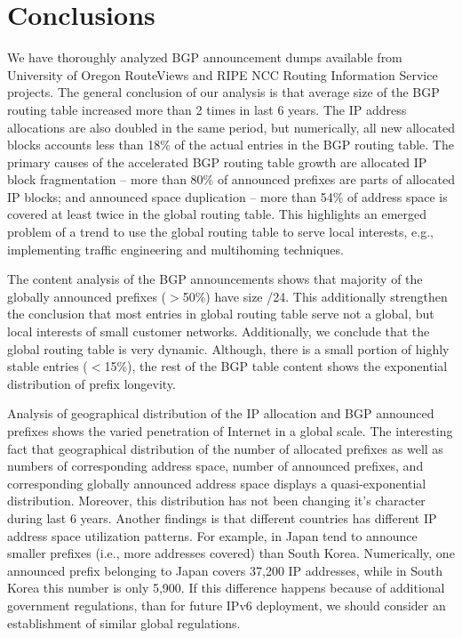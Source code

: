 \section{Conclusions}
\label{sec:conclusions}

We have thoroughly analyzed BGP announcement dumps available from University
of Oregon RouteViews and RIPE NCC Routing Information Service projects. The
general conclusion of our analysis is that average size of the BGP routing
table increased more than 2 times in last 6 years. The IP address allocations
are also doubled in the same period, but numerically, all new allocated blocks
accounts less than 18\% of the actual entries in the BGP routing table. The
primary causes of the accelerated BGP routing table growth are allocated IP
block fragmentation -- more than 80\% of announced prefixes are parts of
allocated IP blocks; and announced space duplication -- more than 54\% of
address space is covered at least twice in the global routing table. This
highlights an emerged problem of a trend to use the global routing table to
serve local interests, e.g., implementing traffic engineering and multihoming
techniques.

The content analysis of the BGP announcements shows that majority of the
globally announced prefixes ($>$50\%) have size /24. This additionally
strengthen the conclusion that most entries in global routing table serve not
a global, but local interests of small customer networks. Additionally, we
conclude that the global routing table is very dynamic. Although, there is a
small portion of highly stable entries ($<$15\%), the rest of the BGP table
content shows the exponential distribution of prefix longevity.

Analysis of geographical distribution of the IP allocation and BGP announced
prefixes shows the varied penetration of Internet in a global scale. The
interesting fact that geographical distribution of the number of allocated
prefixes as well as numbers of corresponding address space, number of
announced prefixes, and corresponding globally announced address space
displays a quasi-exponential distribution. Moreover, this distribution has not
been changing it's character during last 6 years. Another findings is that
different countries has different IP address space utilization patterns. For
example, in Japan tend to announce smaller prefixes (i.e., more addresses
covered) than South Korea. Numerically, one announced prefix belonging to
Japan covers 37,200 IP addresses, while in South Korea this number is only
5,900. If this difference happens because of additional government
regulations, than for future IPv6 deployment, we should consider an
establishment of similar global regulations.

